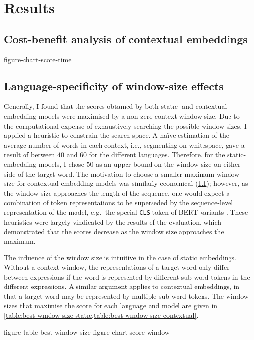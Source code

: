 \section{Results}
\label{sec:results}

\subsection{Cost-benefit analysis of contextual embeddings}
\label{sec:cost-benefit}

{figure-chart-score-time}


\subsection{Language-specificity of window-size effects}

Generally, I found that the scores obtained by both static- and contextual-embedding
models were maximised by a non-zero context-window size.
Due to the computational expense of exhaustively searching the possible window sizes,
I applied a heuristic to constrain the search space.
A naïve estimation of the average number of words in each context, i.e., segmenting on
whitespace, gave a result of between $40$ and $60$ for the different languages.
Therefore, for the static-embedding models, I chose $50$ as an upper bound on the
window size on either side of the target word.
The motivation to choose a smaller maximum window size for contextual-embedding models
was similarly economical (\cref{sec:cost-benefit}); however, as the window size
approaches the length of the sequence, one would expect a combination of token
representations to be superseded by the sequence-level representation of the model,
e.g., the special \texttt{CLS} token of BERT variants \parencite[4174]{Devlin2019}.
These heuristics were largely vindicated by the results of the evaluation, which
demonstrated that the scores decrease as the window size approaches the maximum.

The influence of the window size is intuitive in the case of static embeddings.
Without a context window, the representations of a target word only differ between
expressions if the word is represented by different sub-word tokens in the different
expressions.
A similar argument applies to contextual embeddings, in that a target word may be
represented by multiple sub-word tokens.
The window sizes that maximise the score for each language and model are given in
\cref{table:best-window-size-static,table:best-window-size-contextual}.

{figure-table-best-window-size}
{figure-chart-score-window}